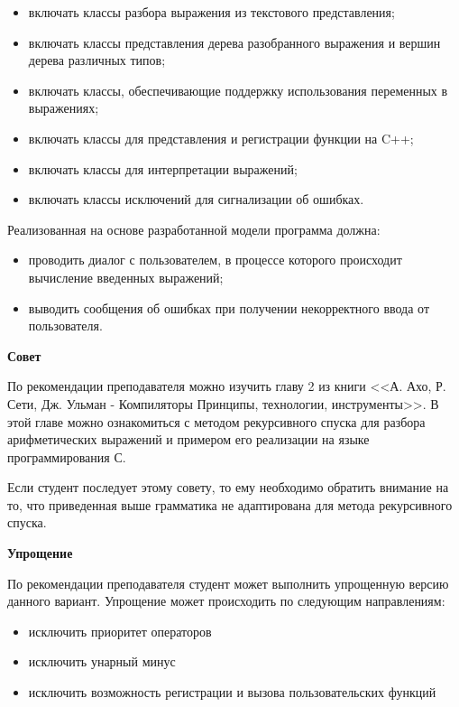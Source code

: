 \documentclass[a4paper,12pt]{article}
\begin{document}
\begin{itemize}
\item включать классы разбора выражения из текстового представления;
\item включать классы представления дерева разобранного выражения и
  вершин дерева различных типов;
\item включать классы, обеспечивающие поддержку использования переменных в
  выражениях;
\item включать классы для представления и регистрации функции на C++;
\item включать классы для интерпретации выражений;
\item включать классы исключений для сигнализации об ошибках.
\end{itemize}

Реализованная на основе разработанной модели программа должна: 

\begin{itemize}
\item проводить диалог с пользователем, в процессе которого происходит
  вычисление введенных выражений;
\item выводить сообщения об ошибках при получении некорректного ввода
  от пользователя.
\end{itemize}

\textbf{Совет}
 
По рекомендации преподавателя можно изучить главу 2 из книги <<А. Ахо,
Р. Сети, Дж. Ульман - Компиляторы Принципы, технологии,
инструменты>>. В этой главе можно ознакомиться с методом рекурсивного
спуска для разбора арифметических выражений и примером его реализации
на языке программирования С.

Если студент последует этому совету, то ему необходимо обратить
внимание на то, что приведенная выше грамматика не адаптирована для
метода рекурсивного спуска.

\textbf{Упрощение}

По рекомендации преподавателя студент может выполнить упрощенную
версию данного вариант. Упрощение может происходить по следующим
направлениям:

\begin{itemize}
\item исключить приоритет операторов
\item исключить унарный минус
\item исключить возможность регистрации и вызова пользовательских
  функций
\end{itemize}
\end{document}

